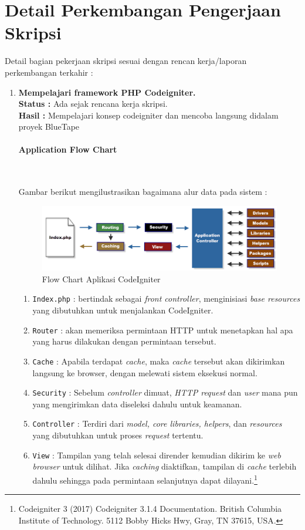 \documentclass[a4paper,twoside]{article}
\newcommand{\myparagraph}[1]{\paragraph{#1}\mbox{}\\}
\begin{document}
	\section{Detail Perkembangan Pengerjaan Skripsi}
	Detail bagian pekerjaan skripsi sesuai dengan rencan kerja/laporan perkembangan terkahir :
	\begin{enumerate}
		\item \textbf{Mempelajari framework PHP Codeigniter.}\\
		{\bf Status :} Ada sejak rencana kerja skripsi.\\
		{\bf Hasil :} Mempelajari konsep codeigniter dan mencoba langsung didalam proyek BlueTape \par
		\myparagraph{Application Flow Chart} \par
		Gambar berikut mengilustrasikan bagaimana alur data pada sistem :
		
		\begin{figure} [H]
			\centering  
			\includegraphics[scale=1.0]{appflowchart.png}  
			\caption{Flow Chart Aplikasi CodeIgniter}
			\label{fig:flow-chart-CodeIgniter} 
		\end{figure}
		
		\begin{enumerate}
			\item \texttt{Index.php} : bertindak sebagai \textit{front controller}, menginisiasi \textit{base resources} yang dibutuhkan untuk menjalankan CodeIgniter.
			\item \texttt{Router} : akan memeriksa permintaan HTTP untuk menetapkan hal apa yang harus dilakukan dengan permintaan tersebut.
			\item \texttt{Cache} : Apabila terdapat \textit{cache}, maka \textit{cache} tersebut akan dikirimkan langsung ke browser, dengan melewati sistem eksekusi normal.
			\item \texttt{Security} : Sebelum \textit{controller} dimuat, \textit{HTTP request} dan \textit{user} mana pun yang mengirimkan data diseleksi dahulu untuk keamanan.
			\item \texttt{Controller} : Terdiri dari \textit{model, core libraries, helpers}, dan \textit{resources} yang dibutuhkan untuk proses \textit{request} tertentu.
			\item \texttt{View} : Tampilan yang telah selesai dirender kemudian dikirim ke \textit{web browser} untuk dilihat. Jika \textit{caching} diaktifkan, tampilan di \textit{cache} terlebih dahulu sehingga pada permintaan selanjutnya dapat dilayani.\footnote{Codeigniter 3 (2017) Codeigniter 3.1.4 Documentation. British Columbia Institute of Technology. 5112 Bobby Hicks Hwy, Gray, TN 37615, USA.}
		\end{enumerate}
		

\end{enumerate}
\end{document}

